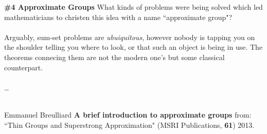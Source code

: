 \documentclass[12pt]{article}
\begin{document}
\newpage 

\noindent \textbf{\#4 Approximate Groups} What kinds of problems were being solved which led mathematicians to christen this idea with a name ``approximate group"?  \\ \\ Arguably, sum-set problems are \textit{ubuiquitous}, however nobody is tapping you on the shoulder telling you where to look, or that such an object is being in use.  The theorems connecing them are not the modern one's but some classical counterpart. \\ \\
\dots \\ \\

\vfill

\begin{thebibliography}{}

\item Emmanuel Breulliard \textbf{A brief introduction to approximate groups} from: ``Thin Groups and Superstrong Approximation" (MSRI Publications, \textbf{61}) 2013.

\end{thebibliography}
\end{document}
